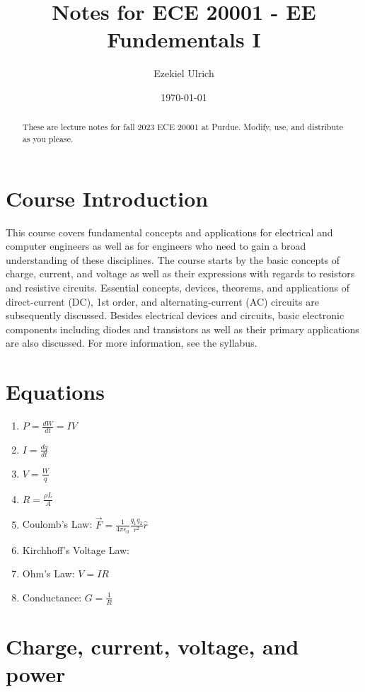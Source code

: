 \documentclass[nobib]{tufte-handout}
\title{Notes for ECE 20001 - EE Fundementals I}
\author[Ezekiel Ulrich]{Ezekiel Ulrich}
\date{\today}  %
\begin{document}
\maketitle

\begin{abstract}
These are lecture notes for fall 2023 ECE 20001 at Purdue. Modify, use, and distribute as you please.
\end{abstract}

\tableofcontents

\section{Course Introduction}

This course covers fundamental concepts and applications 
for electrical and computer engineers as well as for engineers
 who need to gain a broad understanding of these disciplines. 
 The course starts by the basic concepts of charge, current, 
 and voltage as well as their expressions with regards to 
 resistors and resistive circuits. Essential concepts, 
 devices, theorems, and applications of direct-current (DC), 
 1st order, and alternating-current (AC) circuits are 
 subsequently discussed. Besides electrical devices and 
 circuits, basic electronic components including diodes and 
 transistors as well as their primary applications are also 
 discussed. For more information, see the syllabus. 

\section{Equations}

\begin{enumerate}
    \item $P = \frac{dW}{dt} = IV$
    \item $I = \frac{dq}{dt}$
    \item $V = \frac{W}{q}$
    \item $R = \frac{\rho L}{A}$
    \item Coulomb's Law: $\vec{F} = \frac{1}{4\pi \epsilon_0}\frac{q_1 q_2}{r^2}\hat{r}$
    \item Kirchhoff's Voltage Law: 
    \item Ohm's Law: $V=IR$
    \item Conductance: $G = \frac{1}{R}$
\end{enumerate}

\section{Charge, current, voltage, and power}
\end{document}
